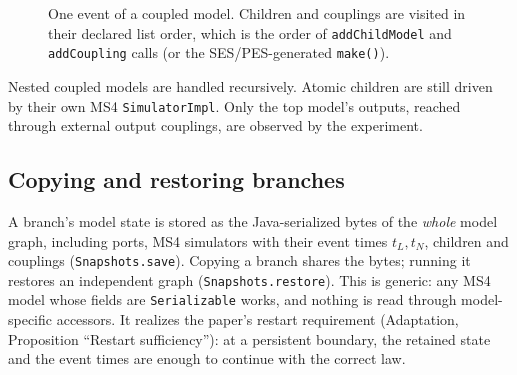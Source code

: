 \documentclass[11pt]{article}
\newcommand{\code}[1]{\texttt{#1}}
\begin{document}
\begin{figure}[h]
\centering
{}
\caption{One event of a coupled model. Children and couplings are visited in their declared list order, which is the
order of \code{addChildModel} and \code{addCoupling} calls (or the SES/PES-generated \code{make()}).}
\label{fig:coord}
\end{figure}

Nested coupled models are handled recursively. Atomic children are still driven by their own MS4 \code{SimulatorImpl}.
Only the top model's outputs, reached through external output couplings, are observed by the experiment.

\subsection{Copying and restoring branches}
A branch's model state is stored as the Java-serialized bytes of the \emph{whole} model graph, including ports, MS4
simulators with their event times $t_L, t_N$, children and couplings (\code{Snapshots.save}). Copying a branch shares
the bytes; running it restores an independent graph (\code{Snapshots.restore}). This is generic: any MS4 model whose
fields are \code{Serializable} works, and nothing is read through model-specific accessors. It realizes the paper's
restart requirement (Adaptation, Proposition ``Restart sufficiency''): at a persistent boundary, the retained state and
the event times are enough to continue with the correct law.
\end{document}
